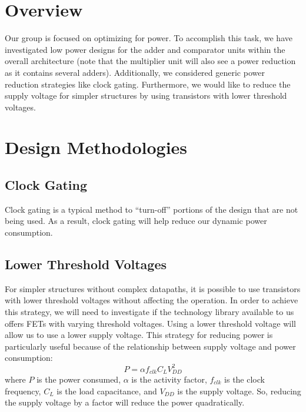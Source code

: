 \documentclass{memo}
\begin{document}
\maketitle

\section{Overview}
Our group is focused on optimizing for power. To accomplish this task, we have investigated low power designs for the adder and comparator units within the overall architecture (note that the multiplier unit will also see a power reduction as it contains several adders). Additionally, we considered generic power reduction strategies like clock gating. Furthermore, we would like to reduce the supply voltage for simpler structures by using transistors with lower threshold voltages.


\section{Design Methodologies}

\subsection{Clock Gating}
Clock gating is a typical method to ``turn-off'' portions of the design that are not being used. As a result, clock gating will help reduce our dynamic power consumption.

\subsection{Lower Threshold Voltages}
For simpler structures without complex datapaths, it is possible to use transistors with lower threshold voltages without affecting the operation. In order to achieve this strategy, we will need to investigate if the technology library available to us offers FETs with varying threshold voltages. Using a lower threshold voltage will allow us to use a lower supply voltage. This strategy for reducing power is particularly useful because of the relationship between supply voltage and power consumption: $$P = \alpha f_{clk} C_L V_{DD}^2$$ where $P$ is the power consumed, $\alpha$ is the activity factor, $f_{clk}$ is the clock frequency, $C_L$ is the load capacitance, and $V_{DD}$ is the supply voltage. So, reducing the supply voltage by a factor will reduce the power quadratically.
\end{document}
